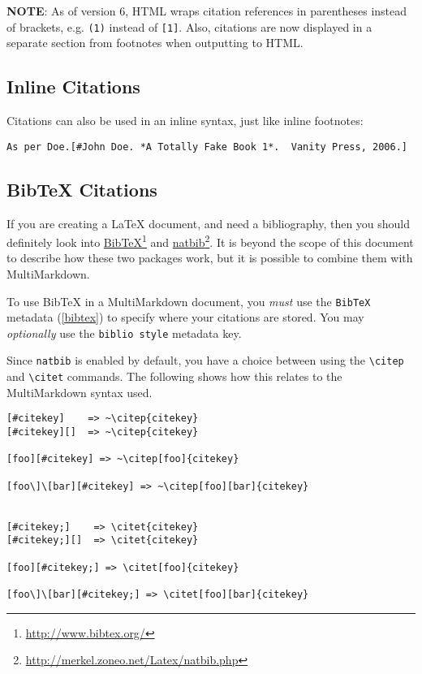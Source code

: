 \textbf{NOTE}: As of version 6, HTML wraps citation references in parentheses instead of brackets, e.g. \texttt{(1)} instead of \texttt{[1]}. Also, citations are now displayed in a separate section from footnotes when outputting to HTML.

\subsection{Inline Citations}
\label{inlinecitations}

Citations can also be used in an inline syntax, just like inline footnotes:

\begin{verbatim}
As per Doe.[#John Doe. *A Totally Fake Book 1*.  Vanity Press, 2006.]
\end{verbatim}

\subsection{BibTeX Citations}
\label{bibtexcitations}

If you are creating a LaTeX document, and need a bibliography, then you should definitely look into \href{http://www.bibtex.org/}{BibTeX}\footnote{\href{http://www.bibtex.org/}{http:\slash{}\slash{}www.bibtex.org\slash{}}} and \href{http://merkel.zoneo.net/Latex/natbib.php}{natbib}\footnote{\href{http://merkel.zoneo.net/Latex/natbib.php}{http:\slash{}\slash{}merkel.zoneo.net\slash{}Latex\slash{}natbib.php}}. It is beyond the scope of this document to describe how these two packages work, but it is possible to combine them with MultiMarkdown.

To use BibTeX in a MultiMarkdown document, you \emph{must} use the \texttt{BibTeX} metadata (\autoref{bibtex}) to specify where your citations are stored. You may \emph{optionally} use the \texttt{biblio style} metadata key.

Since \texttt{natbib} is enabled by default, you have a choice between using the \texttt{\textbackslash{}citep} and \texttt{\textbackslash{}citet} commands. The following shows how this relates to the MultiMarkdown syntax used.

\begin{verbatim}
[#citekey]    => ~\citep{citekey}
[#citekey][]  => ~\citep{citekey}

[foo][#citekey] => ~\citep[foo]{citekey}

[foo\]\[bar][#citekey] => ~\citep[foo][bar]{citekey}


[#citekey;]    => \citet{citekey}
[#citekey;][]  => \citet{citekey}

[foo][#citekey;] => \citet[foo]{citekey}

[foo\]\[bar][#citekey;] => \citet[foo][bar]{citekey}
\end{verbatim}

